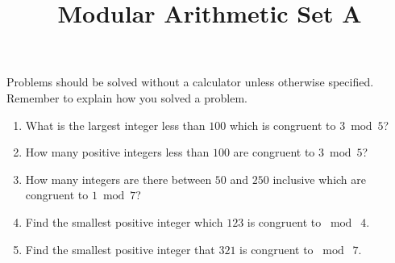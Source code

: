 \documentclass{article}
\title{Modular Arithmetic Set A}
\author{}
\date{}
\begin{document}
\maketitle
\noindent Problems should be solved without a calculator unless otherwise specified.
Remember to explain how you solved a problem.
\begin{multicols}{2}
    \begin{enumerate}
        \item What is the largest integer less than $100$ which is congruent to $3 \bmod 5$?
        \vspace{3cm}
        \item How many positive integers less than $100$ are congruent to $3 \bmod 5$?
        \vspace{3cm}
        \item How many integers are there between $50$ and $250$ inclusive which are congruent to $1 \bmod 7$?
        \vspace{3cm}
        \columnbreak
        \item Find the smallest positive integer which $123$ is congruent to $\bmod \; 4$.
        \vspace{3cm}
        \item Find the smallest positive integer that $321$ is congruent to $\bmod \; 7$.
        \vspace{3cm}
    \end{enumerate}
\end{multicols}
\end{document}
